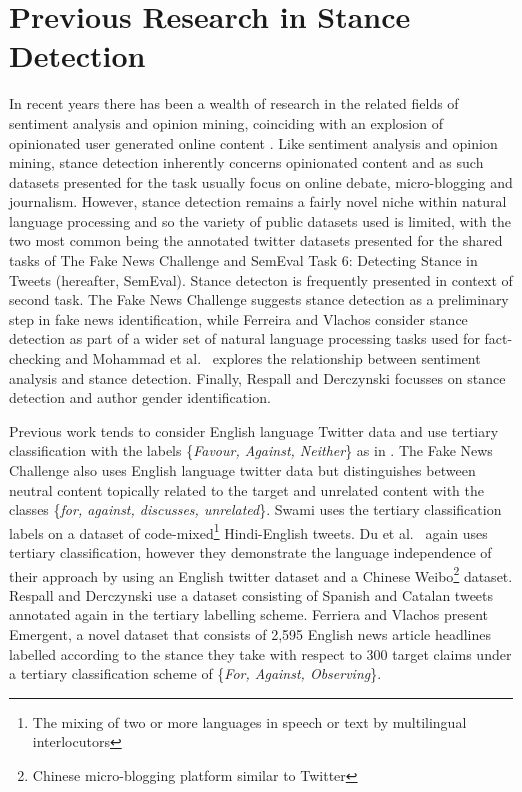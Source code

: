 \documentclass[Dissertation.tex]{subfiles}
\begin{document}
\section{Previous Research in Stance Detection} \label{sec:priorWork}
In recent years there has been a wealth of research in the related fields of sentiment analysis and opinion mining, coinciding with an explosion of opinionated user generated online content \cite{liuSentimentAnalysisOpinion}. Like sentiment analysis and opinion mining, stance detection inherently concerns opinionated content and as such datasets presented for the task usually focus on online debate, micro-blogging and journalism. However, stance detection remains a fairly novel niche within natural language processing and so the variety of public datasets used is limited, with the two most common being the annotated twitter datasets presented for the shared tasks of The Fake News Challenge \cite{FakeNewsChallenge} and SemEval Task 6: Detecting Stance in Tweets \cite{TaskDetectingStance} (hereafter, SemEval). Stance detecton is frequently presented in context of second task. The Fake News Challenge suggests stance detection as a preliminary step in fake news identification, while Ferreira and Vlachos consider stance detection as part of a wider set of natural language processing tasks used for fact-checking \cite{ferreiraEmergentNovelDataset2016} and Mohammad et al.\ \cite{mohammadStanceSentimentTweets2016} explores the relationship between sentiment analysis and stance detection. Finally, Respall and Derczynski \cite{respallStanceDetectionCatalan} focusses on stance detection and author gender identification.

Previous work tends to consider English language Twitter data and use tertiary classification with the labels \{\textit{Favour, Against, Neither}\} as in \cite{TaskDetectingStance,mohammadStanceSentimentTweets2016,mohammadSemEval2016TaskDetecting2016,augensteinStanceDetectionBidirectional2016,deyTwitterStanceDetection2017,deyTopicalStanceDetection2018}. The Fake News Challenge \cite{FakeNewsChallenge} also uses English language twitter data but distinguishes between neutral content topically related to the target and unrelated content with the classes \{\textit{for, against, discusses, unrelated}\}. Swami \cite{swamiEnglishHindiCodeMixedCorpus2018} uses the tertiary classification labels on a dataset of code-mixed\footnote{The mixing of two or more languages in speech or text by multilingual interlocutors} Hindi-English tweets. Du et al.\  \cite{duStanceClassificationTargetspecific} again uses tertiary classification, however they demonstrate the language independence of their approach by using an English twitter dataset and a Chinese Weibo\footnote{Chinese micro-blogging platform similar to Twitter} dataset.  Respall and Derczynski \cite{respallStanceDetectionCatalan} use a dataset consisting of Spanish and Catalan tweets annotated again in the tertiary labelling scheme. Ferriera and Vlachos \cite{ferreiraEmergentNovelDataset2016} present Emergent, a novel dataset that consists of 2,595 English news article headlines labelled according to the stance they take with respect to 300 target claims under a tertiary classification scheme of \{\textit{For, Against, Observing}\}.
\end{document}
